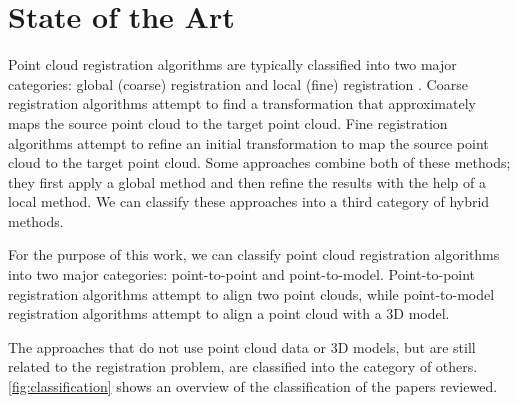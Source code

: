 

    \chapter{State of the Art}
    \label{chap:State of the Art}
    Point cloud registration algorithms are typically classified into two major categories: global (coarse) registration and local (fine) registration \cite{Quan_2020_com,Kim_2011_fully}.
    Coarse registration algorithms attempt to find a transformation that approximately maps the source point cloud to the target point cloud. 
    Fine registration algorithms attempt to refine an initial transformation to map the source point cloud to the target point cloud.
    Some approaches combine both of these methods; they first apply a global method and then refine the results with the help of a local method. 
    We can classify these approaches into a third category of hybrid methods. 
    \par
    
    For the purpose of this work, we can classify point cloud registration algorithms into two major categories:
    point-to-point and point-to-model.
    Point-to-point registration algorithms attempt to align two point clouds, while point-to-model registration algorithms attempt to align a point cloud with a 3D model.

    The approaches that do not use point cloud data or 3D models, but are still related to the registration problem, are classified into the category of others.
    \autoref{fig:classification} shows an overview of the classification of the papers reviewed.
    
